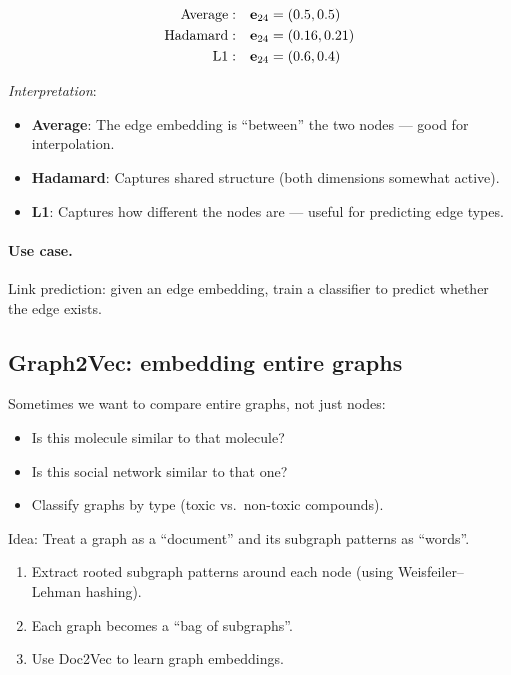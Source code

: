 \begin{notechapter}
\begin{example}
\begin{align*}
\text{Average}: & \quad \mathbf{e}_{24} = (0.5, 0.5) \\
\text{Hadamard}: & \quad \mathbf{e}_{24} = (0.16, 0.21) \\
\text{L1}: & \quad \mathbf{e}_{24} = (0.6, 0.4)
\end{align*}

\emph{Interpretation}:
\begin{itemize}
    \item \textbf{Average}: The edge embedding is ``between'' the two nodes --- good for interpolation.
    \item \textbf{Hadamard}: Captures shared structure (both dimensions somewhat active).
    \item \textbf{L1}: Captures how different the nodes are --- useful for predicting edge types.
\end{itemize}
\end{example}

\paragraph{Use case.} Link prediction: given an edge embedding, train a classifier to predict whether the edge exists.

\subsection{Graph2Vec: embedding entire graphs}

\begin{intuition}[Motivation]
Sometimes we want to compare entire graphs, not just nodes:
\begin{itemize}
    \item Is this molecule similar to that molecule?
    \item Is this social network similar to that one?
    \item Classify graphs by type (toxic vs.\ non-toxic compounds).
\end{itemize}
\end{intuition}

\begin{definition}
Idea: Treat a graph as a ``document'' and its subgraph patterns as ``words''.
\begin{enumerate}
    \item Extract rooted subgraph patterns around each node (using Weisfeiler--Lehman hashing).
    \item Each graph becomes a ``bag of subgraphs''.
    \item Use Doc2Vec to learn graph embeddings.
\end{enumerate}
\end{definition}


\end{notechapter}

